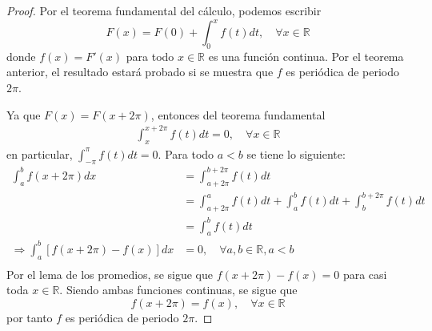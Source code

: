 \documentclass[12pt]{report}
\newcounter{it}
\theoremstyle{largebreak}
\begin{document}
    \begin{proof}
        Por el teorema fundamental del cálculo, podemos escribir
        \begin{equation*}
            F(x)=F(0)+\int_{0}^xf(t)dt,\quad\forall x\in\mathbb{R}
        \end{equation*}
        donde $f(x)=F'(x)$ para todo $x\in\mathbb{R}$ es una función continua. Por el teorema anterior, el resultado estará probado si se muestra que $f$ es periódica de periodo $2\pi$.

        Ya que $F(x)=F(x+2\pi)$, entonces del teorema fundamental
        \begin{equation*}
            \begin{split}
                \int_{x}^{ x+2\pi}f(t)dt=0,\quad\forall x\in\mathbb{R}
            \end{split}
        \end{equation*}
        en particular, $\int_{ -\pi}^{\pi}f(t)dt=0$. Para todo $a<b$ se tiene lo siguiente:
        \begin{equation*}
            \begin{split}
                \int_a^bf(x+2\pi)dx&=\int_{ a+2\pi}^{ b+2\pi}f(t)dt\\
                &=\int_{ a+2\pi}^{a}f(t)dt+\int_a^bf(t)dt+\int_b^{ b+2\pi}f(t)dt \\
                &=\int_a^bf(t)dt\\
                \Rightarrow \int_{ a}^b\left[f(x+2\pi)-f(x) \right]dx&=0,\quad\forall a,b\in\mathbb{R}, a<b \\
            \end{split}
        \end{equation*}
        Por el lema de los promedios, se sigue que $f(x+2\pi)-f(x)=0$ para casi toda $x\in\mathbb{R}$. Siendo ambas funciones continuas, se sigue que
        \begin{equation*}
            f(x+2\pi)=f(x),\quad\forall x\in\mathbb{R}
        \end{equation*}
        por tanto $f$ es periódica de periodo $2\pi$.
    \end{proof}
\end{document}
